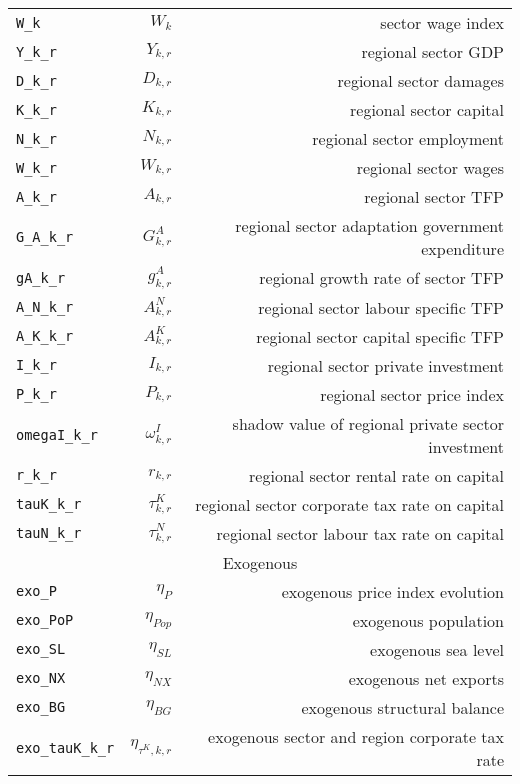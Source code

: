 \begin{center}
\begin{longtable}{lrr}
\texttt{W\_k} & ${W_k}$ & sector wage index\\
\texttt{Y\_k\_r} & ${Y_{k,r}}$ & regional sector GDP\\
\texttt{D\_k\_r} & ${D_{k,r}}$ & regional sector damages\\
\texttt{K\_k\_r} & ${K_{k,r}}$ & regional sector capital\\
\texttt{N\_k\_r} & ${N_{k,r}}$ & regional sector employment\\
\texttt{W\_k\_r} & ${W_{k,r}}$ & regional sector wages\\
\texttt{A\_k\_r} & ${A_{k,r}}$ & regional sector TFP\\
\texttt{G\_A\_k\_r} & ${G^{A}_{k,r}}$ & regional sector adaptation government expenditure\\
\texttt{gA\_k\_r} & ${g^{A}_{k,r}}$ & regional growth rate of sector TFP\\
\texttt{A\_N\_k\_r} & ${A^{N}_{k,r}}$ & regional sector labour specific TFP\\
\texttt{A\_K\_k\_r} & ${A^{K}_{k,r}}$ & regional sector capital specific TFP\\
\texttt{I\_k\_r} & ${I_{k,r}}$ & regional sector private investment\\
\texttt{P\_k\_r} & ${P_{k,r}}$ & regional sector price index\\
\texttt{omegaI\_k\_r} & ${\omega^I_{k,r}}$ & shadow value of regional private sector investment\\
\texttt{r\_k\_r} & ${r_{k,r}}$ & regional sector rental rate on capital\\
\texttt{tauK\_k\_r} & ${\tau^{K}_{k,r}}$ & regional sector corporate tax rate on capital\\
\texttt{tauN\_k\_r} & ${\tau^{N}_{k,r}}$ & regional sector labour tax rate on capital\\
\hline
\multicolumn{3}{c}{Exogenous}\\%
\hline
\texttt{exo\_P} & ${\eta_{P}}$ & exogenous price index evolution\\
\texttt{exo\_PoP} & ${\eta_{Pop}}$ & exogenous population\\
\texttt{exo\_SL} & ${\eta_{SL}}$ & exogenous sea level\\
\texttt{exo\_NX} & ${\eta_{NX}}$ & exogenous net exports\\
\texttt{exo\_BG} & ${\eta_{BG}}$ & exogenous structural balance\\
\texttt{exo\_tauK\_k\_r} & ${\eta_{\tau^{K},k,r}}$ & exogenous sector and region corporate tax rate\\

\end{longtable}
\end{center}
